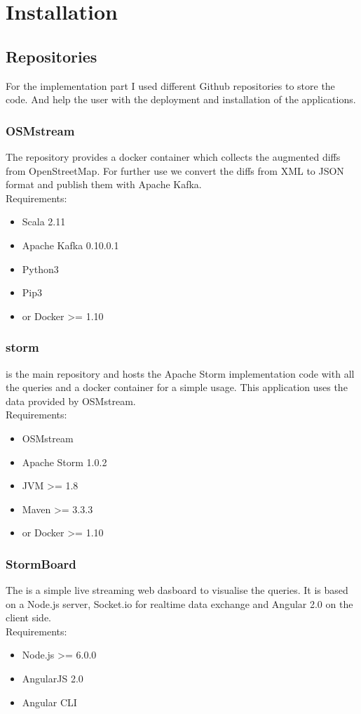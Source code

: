 \chapter{Installation}
\newpage

\section{Repositories}
For the implementation part I used different Github repositories to store the code.
And help the user with the deployment and installation of the applications.

\subsection{OSMstream}
The  repository provides a docker container which collects the augmented diffs from OpenStreetMap.
For further use we convert the diffs from XML to JSON format and publish them with Apache Kafka. \\
\medskip
Requirements:
\begin{itemize}
    \item Scala 2.11
    \item Apache Kafka 0.10.0.1
    \item Python3
    \item Pip3
    \item or Docker \textgreater= 1.10
\end{itemize}
\newpage
\subsection{storm}
 is the main repository and hosts the Apache Storm implementation code with all the queries and a docker container for a simple usage.
This application uses the data provided by OSMstream.\\
\medskip
Requirements:
\begin{itemize}
    \item OSMstream
    \item Apache Storm 1.0.2
    \item JVM \textgreater= 1.8
    \item Maven \textgreater= 3.3.3
    \item or Docker \textgreater= 1.10
\end{itemize}


\subsection{StormBoard}
The  is a simple live streaming web dasboard to visualise the queries.
It is based on a Node.js server, Socket.io for realtime data exchange and Angular 2.0 on the client side.\\
\medskip
Requirements:
\begin{itemize}
    \item Node.js \textgreater= 6.0.0
    \item AngularJS 2.0
    \item Angular CLI
\end{itemize}
